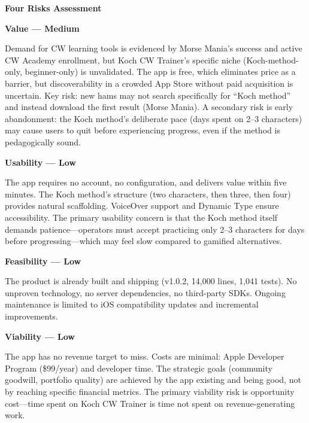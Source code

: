 \documentclass[11pt,letterpaper]{article}
\newcommand{\riskitem}[2]{%
  \vspace{0.6em}%
  \noindent\textbf{\color{SectionBlue}#1}\par
  \vspace{0.2em}%
  \noindent #2\par
}
\begin{document}
\begin{mdframed}[
  linewidth=0.5pt,
  linecolor=QuoteBorder,
  backgroundcolor=BoxBg,
  innerleftmargin=12pt,
  innerrightmargin=12pt,
  innertopmargin=10pt,
  innerbottommargin=10pt,
]
{\bfseries\color{SectionBlue}Four Risks Assessment}

\riskitem{Value --- \textcolor{RiskAmber}{Medium}}{Demand for CW learning tools is evidenced by Morse Mania's success and active CW Academy enrollment, but Koch CW Trainer's specific niche (Koch-method-only, beginner-only) is unvalidated. The app is free, which eliminates price as a barrier, but discoverability in a crowded App Store without paid acquisition is uncertain. Key risk: new hams may not search specifically for ``Koch method'' and instead download the first result (Morse Mania). A secondary risk is early abandonment: the Koch method's deliberate pace (days spent on 2--3 characters) may cause users to quit before experiencing progress, even if the method is pedagogically sound.}

\riskitem{Usability --- \textcolor{RiskGreen}{Low}}{The app requires no account, no configuration, and delivers value within five minutes. The Koch method's structure (two characters, then three, then four) provides natural scaffolding. VoiceOver support and Dynamic Type ensure accessibility. The primary usability concern is that the Koch method itself demands patience---operators must accept practicing only 2--3 characters for days before progressing---which may feel slow compared to gamified alternatives.}

\riskitem{Feasibility --- \textcolor{RiskGreen}{Low}}{The product is already built and shipping (v1.0.2, 14,000 lines, 1,041 tests). No unproven technology, no server dependencies, no third-party SDKs. Ongoing maintenance is limited to iOS compatibility updates and incremental improvements.}

\riskitem{Viability --- \textcolor{RiskGreen}{Low}}{The app has no revenue target to miss. Costs are minimal: Apple Developer Program (\$99/year) and developer time. The strategic goals (community goodwill, portfolio quality) are achieved by the app existing and being good, not by reaching specific financial metrics. The primary viability risk is opportunity cost---time spent on Koch CW Trainer is time not spent on revenue-generating work.}
\end{mdframed}
\end{document}

